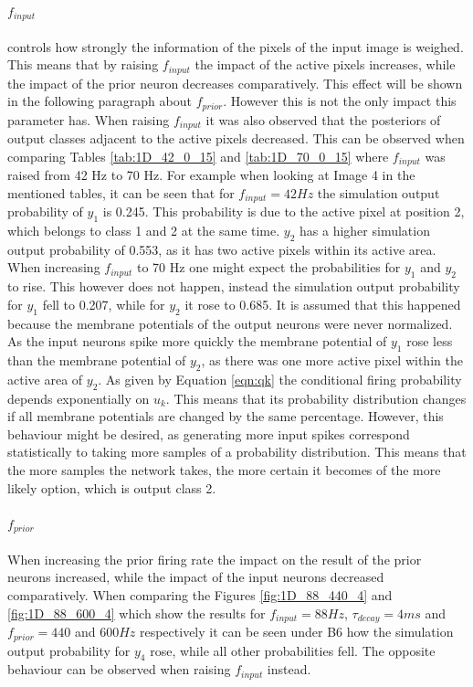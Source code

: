 \paragraph{$f_{input}$} controls how strongly the information of the pixels of the input image is weighed. This means that by raising $f_{input}$ the impact of the active pixels increases, while the impact of the prior neuron decreases comparatively. This effect will be shown in the following paragraph about $f_{prior}$. However this is not the only impact this parameter has. When raising $f_{input}$ it was also observed that the posteriors of output classes adjacent to the active pixels decreased. This can be observed when comparing Tables \ref{tab:1D_42_0_15} and \ref{tab:1D_70_0_15} where $f_{input}$ was raised from 42 Hz to 70 Hz. For example when looking at Image 4 in the mentioned tables, it can be seen that for $f_{input} = 42 Hz$ the simulation output probability of $y_1$ is 0.245. This probability is due to the active pixel at position 2, which belongs to class 1 and 2 at the same time. $y_2$ has a higher simulation output probability of 0.553, as it has two active pixels within its active area. When increasing $f_{input}$ to 70 Hz one might expect the probabilities for $y_1$ and $y_2$ to rise. This however does not happen, instead the simulation output probability for $y_1$ fell to 0.207, while for $y_2$ it rose to 0.685. It is assumed that this happened because the membrane potentials of the output neurons were never normalized. As the input neurons spike more quickly the membrane potential of $y_1$ rose less than the membrane potential of $y_2$, as there was one more active pixel within the active area of $y_2$. As given by Equation \ref{eqn:qk} the conditional firing probability depends exponentially on $u_k$. This means that its probability distribution changes if all membrane potentials are changed by the same percentage. However, this behaviour might be desired, as generating more input spikes correspond statistically to taking more samples of a probability distribution. This means that the more samples the network takes, the more certain it becomes of the more likely option, which is output class 2.

\paragraph{$f_{prior}$} When increasing the prior firing rate the impact on the result of the prior neurons increased, while the impact of the input neurons decreased comparatively. When comparing the Figures \ref{fig:1D_88_440_4} and \ref{fig:1D_88_600_4} which show the results for $f_{input} = 88 Hz$, $\tau_{decay} = 4 ms$ and $f_{prior} = 440$ and $600 Hz$ respectively it can be seen under B6 how the simulation output probability for $y_4$ rose, while all other probabilities fell. The opposite behaviour can be observed when raising $f_{input}$ instead.

